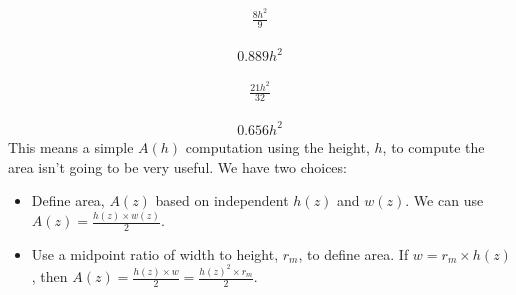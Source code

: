 \documentclass[letterpaper,10pt,english]{sphinxmanual}
\begin{document}
\begin{sphinxVerbatim}[commandchars=\\\{\}]
\end{sphinxVerbatim}
\begin{equation*}
\begin{split}\displaystyle \frac{8 h^{2}}{9}\end{split}
\end{equation*}
\begin{sphinxVerbatim}[commandchars=\\\{\}]
\end{sphinxVerbatim}
\begin{equation*}
\begin{split}\displaystyle 0.889 h^{2}\end{split}
\end{equation*}
\begin{sphinxVerbatim}[commandchars=\\\{\}]
\end{sphinxVerbatim}
\begin{equation*}
\begin{split}\displaystyle \frac{21 h^{2}}{32}\end{split}
\end{equation*}
\begin{sphinxVerbatim}[commandchars=\\\{\}]
\end{sphinxVerbatim}
\begin{equation*}
\begin{split}\displaystyle 0.656 h^{2}\end{split}
\end{equation*}
\sphinxAtStartPar
This means a simple \(A(h)\) computation using the height, \(h\), to compute the area isn’t going to be very useful. We have two choices:
\begin{itemize}
\item {} 
\sphinxAtStartPar
Define area, \(A(z)\) based on independent  \(h(z)\) and \(w(z)\). We can use \(A(z) = \frac{h(z) \times w(z)}{2}\).

\item {} 
\sphinxAtStartPar
Use a midpoint ratio of width to height, \(r_m\), to define area. If \(w = r_m \times h(z)\), then \(A(z) = \frac{h(z) \times w}{2} = \frac{h(z)^2 \times r_m}{2}\).

\end{itemize}
\end{document}
